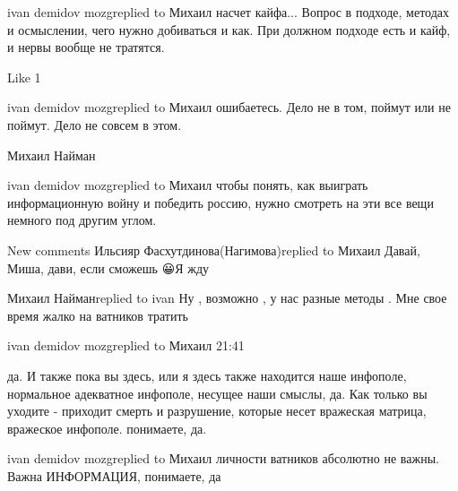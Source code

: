 ivan demidov mozgreplied to Михаил
насчет кайфа... Вопрос в подходе, методах и осмыслении, чего нужно добиваться и как. При должном подходе есть и кайф, и нервы вообще не тратятся.

    Like 1

ivan demidov mozgreplied to Михаил
ошибаетесь. Дело не в том, поймут или не поймут. Дело не совсем в этом.

Михаил Найман

ivan demidov mozgreplied to Михаил
чтобы понять, как выиграть информационную войну и победить россию, нужно смотреть на эти все вещи немного под другим углом.

New comments
Ильсияр Фасхутдинова(Нагимова)replied to Михаил
Давай, Миша, дави, если сможешь 😀Я жду🤣

Михаил Найманreplied to ivan
Ну , возможно , у нас разные методы . Мне свое время жалко на ватников тратить

ivan demidov mozgreplied to Михаил
21:41

да. И также пока вы здесь, или я здесь также находится наше инфополе,
нормальное адекватное инфополе, несущее наши смыслы, да. Как только вы уходите
- приходит смерть и разрушение, которые несет вражеская матрица, вражеское
инфополе. понимаете, да.

ivan demidov mozgreplied to Михаил
личности ватников абсолютно не важны. Важна ИНФОРМАЦИЯ, понимаете, да
